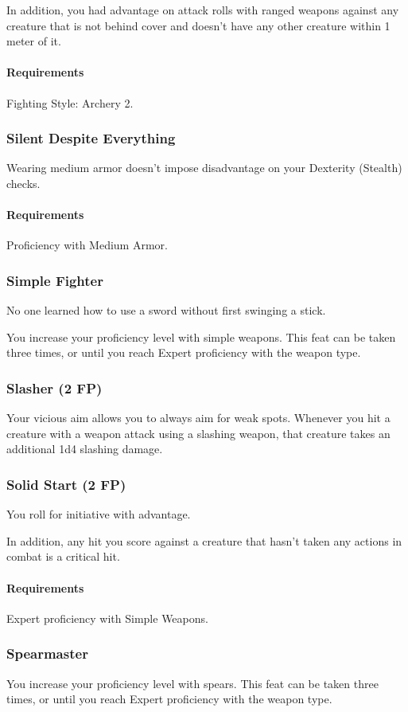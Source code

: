     In addition, you had advantage on attack rolls with ranged weapons against any creature that is not behind cover and doesn't have any other creature within 1 meter of it.
    \paragraph{Requirements} Fighting Style: Archery 2.
\subsubsection{Silent Despite Everything} \label{feat::silentdespiteeverything}
    Wearing medium armor doesn't impose disadvantage on your Dexterity (Stealth) checks.
    \paragraph{Requirements} Proficiency with Medium Armor.
\subsubsection{Simple Fighter} \label{feat::simplefighter}
    No one learned how to use a sword without first swinging a stick.

    You increase your proficiency level with simple weapons.
    This feat can be taken three times, or until you reach Expert proficiency with the weapon type.
\subsubsection{Slasher (2 FP)} \label{feat::slasher}
    Your vicious aim allows you to always aim for weak spots.
    Whenever you hit a creature with a weapon attack using a slashing weapon, that creature takes an additional 1d4 slashing damage.
\subsubsection{Solid Start (2 FP)} \label{feat::solidstart}
    You roll for initiative with advantage.

    In addition, any hit you score against a creature that hasn't taken any actions in combat is a critical hit.
    \paragraph{Requirements} Expert proficiency with Simple Weapons.
\subsubsection{Spearmaster} \label{feat::spearmaster}
    You increase your proficiency level with spears.
    This feat can be taken three times, or until you reach Expert proficiency with the weapon type.
